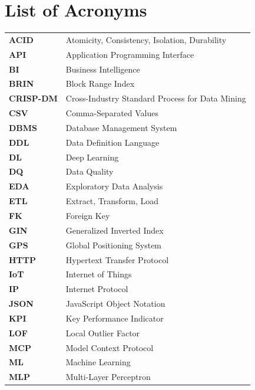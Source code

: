 \chapter*{List of Acronyms}
\thispagestyle{plain}

\begin{tabular}{p{3cm}p{11cm}}
\textbf{ACID}     & Atomicity, Consistency, Isolation, Durability \\
\textbf{API}      & Application Programming Interface \\
\textbf{BI}       & Business Intelligence \\
\textbf{BRIN}     & Block Range Index \\
\textbf{CRISP-DM} & Cross-Industry Standard Process for Data Mining \\
\textbf{CSV}      & Comma-Separated Values \\
\textbf{DBMS}     & Database Management System \\
\textbf{DDL}      & Data Definition Language \\
\textbf{DL}       & Deep Learning \\
\textbf{DQ}       & Data Quality \\
\textbf{EDA}      & Exploratory Data Analysis \\
\textbf{ETL}      & Extract, Transform, Load \\
\textbf{FK}       & Foreign Key \\
\textbf{GIN}      & Generalized Inverted Index \\
\textbf{GPS}      & Global Positioning System \\
\textbf{HTTP}     & Hypertext Transfer Protocol \\
\textbf{IoT}      & Internet of Things \\
\textbf{IP}       & Internet Protocol \\
\textbf{JSON}     & JavaScript Object Notation \\
\textbf{KPI}      & Key Performance Indicator \\
\textbf{LOF}      & Local Outlier Factor \\
\textbf{MCP}      & Model Context Protocol \\
\textbf{ML}       & Machine Learning \\
\textbf{MLP}      & Multi-Layer Perceptron \\

\end{tabular}
